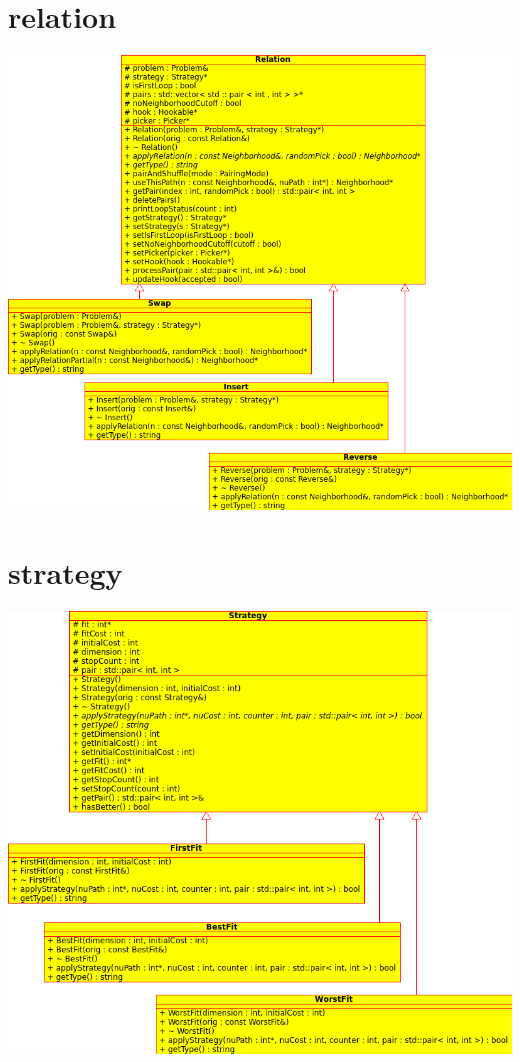 \documentclass[a4paper,10pt]{report}
\begin{document}
\section{relation}
\includegraphics[width=\textwidth]{../UML/relation.png}

\section{strategy}
\includegraphics[width=\textwidth]{../UML/strategy.png}
\end{document}
